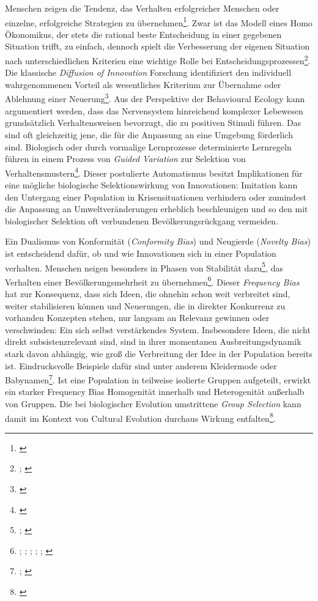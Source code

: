 \documentclass[openany,twoside,twocolumn]{book}
\let\rmarkdownfootnote\footnote%
\def\footnote{\protect\rmarkdownfootnote}
\begin{document}
Menschen zeigen die Tendenz, das Verhalten erfolgreicher Menschen oder
einzelne, erfolgreiche Strategien zu übernehmen\footnote{\textcite{henrich_evolution_2003}}.
Zwar ist das Modell eines Homo Ökonomikus, der stets die rational beste
Entscheidung in einer gegebenen Situation trifft, zu einfach, dennoch
spielt die Verbesserung der eigenen Situation nach unterschiedlichen
Kriterien eine wichtige Rolle bei Entscheidungsprozessen\footnote{\textcite{mesoudi_cultural_2008};
  \textcite{mesoudi_experimental_2011}}. Die klassische \emph{Diffusion
of Innovation} Forschung identifiziert den individuell wahrgenommenen
Vorteil als wesentliches Kriterium zur Übernahme oder Ablehnung einer
Neuerung\footnote{\textcite{rogers_diffusion_1983}}. Aus der Perspektive
der Behavioural Ecology kann argumentiert werden, dass das Nervensystem
hinreichend komplexer Lebewesen grundsätzlich Verhaltensweisen
bevorzugt, die zu positiven Stimuli führen. Das sind oft gleichzeitig
jene, die für die Anpassung an eine Umgebung förderlich sind. Biologisch
oder durch vormalige Lernprozesse determinierte Lernregeln führen in
einem Prozess von \emph{Guided Variation} zur Selektion von
Verhaltensmustern\footnote{\textcite{smith_cultural_1992}}. Dieser
postulierte Automatismus besitzt Implikationen für eine mögliche
biologische Selektionswirkung von Innovationen: Imitation kann den
Untergang einer Population in Krisensituationen verhindern oder
zumindest die Anpassung an Umweltveränderungen erheblich beschleunigen
und so den mit biologischer Selektion oft verbundenen
Bevölkerungsrückgang vermeiden.

Ein Dualismus von Konformität (\emph{Conformity Bias}) und Neugierde
(\emph{Novelty Bias}) ist entscheidend dafür, ob und wie Innovationen
sich in einer Population verhalten. Menschen neigen besonders in Phasen
von Stabilität dazu\footnote{\textcite{henrich_evolution_1998};
  \textcite{kendal_evolution_2009}}, das Verhalten einer
Bevölkerungsmehrheit zu übernehmen\footnote{\textcite{bikhchandani_learning_1998};
  \textcite{efferson_conformists_2008};
  \textcite{giraldeau_social_1994}; \textcite{henrich_evolution_1998};
  \textcite{heinrich_why_2001}; \textcite{smith_conformity_1994}}.
Dieser \emph{Frequency Bias} hat zur Konsequenz, dass sich Ideen, die
ohnehin schon weit verbreitet sind, weiter stabilisieren können und
Neuerungen, die in direkter Konkurrenz zu vorhanden Konzepten stehen,
nur langsam an Relevanz gewinnen oder verschwinden: Ein sich selbst
verstärkendes System. Insbesondere Ideen, die nicht direkt
subsistenzrelevant sind, sind in ihrer momentanen Ausbreitungsdynamik
stark davon abhängig, wie groß die Verbreitung der Idee in der
Population bereits ist. Eindrucksvolle Beispiele dafür sind unter
anderem Kleidermode oder Babynamen\footnote{\textcite{acerbi_biases_2014};
  \textcite{acerbi_logic_2012}}. Ist eine Population in teilweise
isolierte Gruppen aufgeteilt, erwirkt ein starker Frequency Bias
Homogenität innerhalb und Heterogenität außerhalb von Gruppen. Die bei
biologischer Evolution umstrittene \emph{Group Selection} kann damit im
Kontext von Cultural Evolution durchaus Wirkung entfalten\footnote{\textcite{smith_cultural_1992}}.
\end{document}
